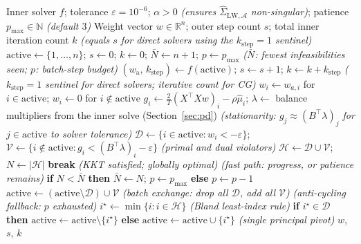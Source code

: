 \begin{algorithm}[ht]
\caption{Active-set outer loop (wraps any inner solver $f$)}\label{alg:elim}
\begin{algorithmic}[1]
\Require Inner solver $f$;\; tolerance $\varepsilon = 10^{-6}$;\; $\alpha > 0$
  \hfill\textit{(ensures $\hat\Sigma_{\mathrm{LW},\mathcal{A}}$ non-singular)};\; patience $p_{\max} \in \mathbb{N}$ \textit{(default $3$)}
\Ensure Weight vector $w \in \mathbb{R}^n$;\; outer step count $s$;\; total inner iteration count $k$ \textit{(equals $s$ for direct solvers using the $k_{\mathrm{step}}=1$ sentinel)}
\State $\mathrm{active} \leftarrow \{1,\ldots,n\}$;\; $s \leftarrow 0$;\; $k \leftarrow 0$;\; $\bar N \leftarrow n+1$;\; $p \leftarrow p_{\max}$
  \hfill\textit{($\bar N$: fewest infeasibilities seen; $p$: batch-step budget)}
\Loop
  \State $(w_{\mathrm{a}},\, k_{\mathrm{step}}) \leftarrow f(\mathrm{active})$;\; $s \leftarrow s + 1$;\; $k \leftarrow k + k_{\mathrm{step}}$
    \hfill\textit{($k_{\mathrm{step}} = 1$ sentinel for direct solvers; iterative count for CG)}
  \State $w_i \leftarrow w_{a,i}$ for $i \in \mathrm{active}$;\; $w_i \leftarrow 0$ for $i \notin \mathrm{active}$
  \State $g_i \leftarrow \tfrac{2}{T}(X^\top Xw)_i - \rho\hat\mu_i$;\;
         $\lambda \leftarrow$ balance multipliers from the inner solve (Section~\ref{sec:pd})
    \hfill\textit{(stationarity: $g_j \approx (B^\top\lambda)_j$ for $j \in \mathrm{active}$ to solver tolerance)}
  \State $\mathcal{D} \leftarrow \{i \in \mathrm{active} : w_i < -\varepsilon\}$;\;
         $\mathcal{V} \leftarrow \{i \notin \mathrm{active} : g_i < (B^\top\lambda)_i - \varepsilon\}$
    \hfill\textit{(primal and dual violators)}
  \State $\mathcal{H} \leftarrow \mathcal{D} \cup \mathcal{V}$;\; $N \leftarrow |\mathcal{H}|$
    \State \textbf{break} \hfill\textit{(KKT satisfied; globally optimal)}
    \hfill\textit{(fast path: progress, or patience remains)}
    \State \textbf{if} $N < \bar N$ \textbf{ then } $\bar N \leftarrow N$;\; $p \leftarrow p_{\max}$ \textbf{ else } $p \leftarrow p - 1$
    \State $\mathrm{active} \leftarrow (\mathrm{active} \setminus \mathcal{D}) \cup \mathcal{V}$
      \hfill\textit{(batch exchange: drop all $\mathcal{D}$, add all $\mathcal{V}$)}
  \Else
    \hfill\textit{(anti-cycling fallback: $p$ exhausted)}
    \State $i^\star \leftarrow \min\{i : i \in \mathcal{H}\}$
      \hfill\textit{(Bland least-index rule)}
    \State \textbf{if} $i^\star \in \mathcal{D}$ \textbf{ then } $\mathrm{active} \leftarrow \mathrm{active} \setminus \{i^\star\}$
           \textbf{ else } $\mathrm{active} \leftarrow \mathrm{active} \cup \{i^\star\}$
      \hfill\textit{(single principal pivot)}
  \EndIf
\EndLoop
\State \Return $w$, $s$, $k$
\end{algorithmic}
\end{algorithm}

